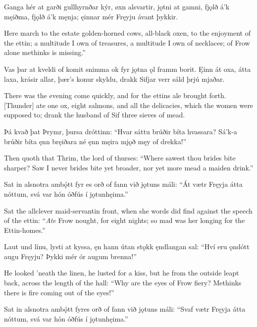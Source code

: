 Ganga hér at garði \hld gullhyrnðar kýr,
øxn alsvartir, \hld jǫtni at gamni,
fjǫlð á’k męiðma, \hld fjǫlð á’k męnja;
ęinnar mér Fręyju \hld ávant þykkir.

Here march to the estate golden-horned cows, all-black oxen, to the enjoyment of the ettin; a multitude I own of treasures, a multitude I own of necklaces; of Frow alone methinks is missing.”

Vas þar at kveldi \hld of komit snimma
ok fyr jǫtna \hld ǫl framm borit.
Ęinn át oxa, \hld átta laxa,
krásir allar, \hld þær’s konur skyldu,
drakk Sifjar verr \hld sáld þrjú mjaðar. 

There was the evening come quickly, and for the ettins ale brought forth. [Thunder] ate one ox, eight salmons, and all the delicacies, which the women were supposed to; drank the husband of Sif three sieves of mead.

Þá kvað þat Þrymr, \hld þursa dróttinn:
“Hvar sáttu brúðir \hld bíta hvassara?
Sá’k-a brúðir \hld bíta ęnn bręiðara
né ęnn męira mjǫð \hld męy of drekka!”

Then quoth that Thrim, the lord of thurses: “Where sawest thou brides bite sharper? Saw I never brides bite yet broader, nor yet more mead a maiden drink.”

Sat in alsnotra \hld ambǫ́tt fyr
es orð of fann \hld við jǫtuns máli:
“Át vætr Fręyja \hld átta nóttum,
svá var hón óðfús \hld í jǫtunhęima.”

Sat the allclever maid-servant\footnotemark[1] in front, when she words did find against the speech of the ettin: “\emph{Ate} Frow nought, for eight nights; so mad was her longing for the Ettin-homes.\footnotemark[2]”

Laut und línu, \hld lysti at kyssa,
ęn hann útan stǫkk \hld ęndlangan sal:
“Hví eru ǫndótt \hld augu Fręyju?
Þykki mér ór \hld augum brenna!”

He looked ’neath the linen, he lusted for a kiss, but he from the outside leapt back, across the length of the hall: “Why are the eyes of Frow fiery? Methinks there is fire coming out of the eyes!\footnotemark[1]”

Sat in alsnotra \hld ambǫ́tt fyr\footnotemark[1]
es orð of fann \hld við jǫtuns máli:
“Svaf vætr Fręyja \hld átta nóttum,
svá var hón óðfús \hld í jǫtunhęima.”


